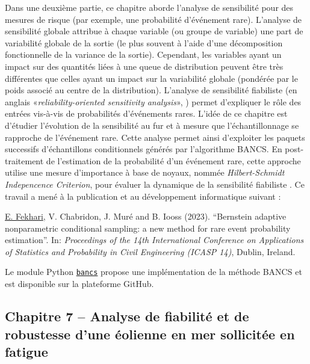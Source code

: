 Dans une deuxième partie, ce chapitre aborde l'analyse de sensibilit\'{e} pour des mesures de risque (par exemple, une probabilit\'{e} d'\'{e}v\'{e}nement rare). 
L'analyse de sensibilit\'{e} globale \citep{daveiga_iooss_2021} attribue à chaque variable (ou groupe de variable) une part de variabilit\'{e} globale de la sortie (le plus souvent à l'aide d'une d\'{e}composition fonctionnelle de la variance de la sortie). 
Cependant, les variables ayant un impact sur des quantit\'{e}s li\'{e}es à une queue de distribution peuvent être très diff\'{e}rentes que celles ayant un impact sur la variabilit\'{e} globale (pond\'{e}r\'{e}e par le poids associ\'{e} au centre de la distribution). 
L'analyse de sensibilit\'{e} fiabiliste (en anglais «\textit{reliability-oriented sensitivity analysis}», \citealp{chabridon_2018_thesis}) permet d'expliquer le rôle des entr\'{e}es vis-à-vis de probabilit\'{e}s d'\'{e}v\'{e}nements rares. 
L'id\'{e}e de ce chapitre est d'\'{e}tudier l'\'{e}volution de la sensibilit\'{e} au fur et à mesure que l'\'{e}chantillonnage se rapproche de l'\'{e}v\'{e}nement rare. 
Cette analyse permet ainsi d'exploiter les paquets successifs d'\'{e}chantillons conditionnels g\'{e}n\'{e}r\'{e}s par l'algorithme BANCS. 
En post-traitement de l'estimation de la probabilit\'{e} d'un \'{e}v\'{e}nement rare, cette approche utilise une mesure d'importance à base de noyaux, nomm\'{e}e \textit{Hilbert-Schmidt Indepencence Criterion}, pour \'{e}valuer la dynamique de la sensibilit\'{e} fiabiliste \citep{marrel_chabridon_2021}.
Ce travail a men\'{e} à la publication et au d\'{e}veloppement informatique suivant : 

\medskip
\noindent
{} \underline{E. Fekhari}, V. Chabridon, J. Mur\'{e} and B. Iooss (2023). ``Bernstein adaptive nonparametric conditional sampling: a new method for rare event probability estimation''. In: \textit{Proceedings of the 14th International Conference on Applications of Statistics and Probability in Civil Engineering (ICASP 14)}, Dublin, Ireland.

\medskip
\noindent
{} Le module Python \href{https://github.com/efekhari27/bancs}{\texttt{bancs}} propose une impl\'{e}mentation de la m\'{e}thode BANCS et est disponible sur la plateforme GitHub. 

\subsection*{Chapitre 7 -- Analyse de fiabilit\'{e} et de robustesse d'une \'{e}olienne en mer sollicit\'{e}e en fatigue}

